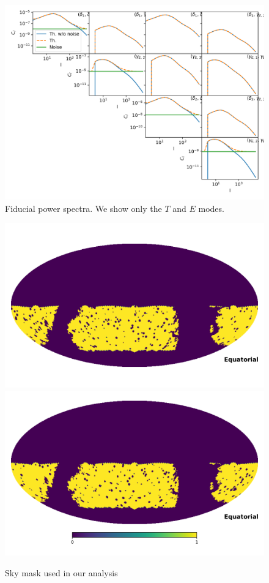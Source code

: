 \documentclass[a4paper,11pt]{article}
\begin{document}
\begin{figure}
  \centering
  \includegraphics[width=\textwidth]{./figures/cls-sph-2b.png}
  \caption{Fiducial power spectra. We show only the $T$ and $E$ modes.}
  \label{fig:cl-2bins}
\end{figure}

\begin{figure}
  \centering
  \includegraphics[width=\columnwidth]{./figures/mask-lss1.png}\\
  \includegraphics[width=\columnwidth]{./figures/mask-lss2.png}
  \caption{Sky mask used in our analysis}
  \label{fig:mask}
\end{figure}
\end{document}
